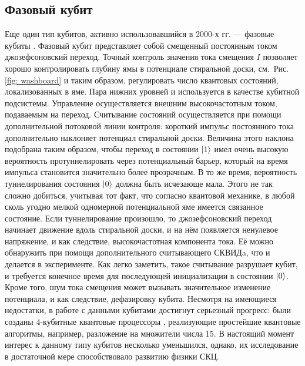 \subsection{Фазовый кубит}
Еще один тип кубитов, активно использовавшийся в 2000-х гг. --- фазовые кубиты \cite{martinis2009superconducting}. Фазовый кубит представляет собой смещенный постоянным током джозефсоновский переход. Точный контроль значения тока смещения $I$ позволяет хорошо контролировать глубину ямы в потенциале стиральной доски, см.~Рис. \ref{fig: washboard} и таким образом, регулировать число квантовых состояний, локализованных в яме. Пара нижних уровней и используется в качестве кубитной подсистемы. Управление осуществляется внешним высокочастотным током, подаваемым на переход. Считывание состояний \cite{steffen2006measurement} осуществляется при помощи дополнительной потоковой линии контроля: короткий импульс постоянного тока дополнительно наклоняет потенциал стиральной доски. Величина этого наклона подобрана таким образом, чтобы переход в состоянии $\ket{1}$ имел очень высокую вероятность протуннелировать через потенциальный барьер, который на время импульса становится значительно более прозрачным. В то же время, вероятность туннелирования состояния $\ket{0}$ должна быть исчезающе мала. Этого не так сложно добиться, учитывая тот факт, что согласно квантовой механике, в любой сколь угодно мелкой одномерной потенциальной яме имеется связанное состояние. Если туннелирование произошло, то джозефсоновский переход начинает движение вдоль стиральной доски, и на нём появляется ненулевое напряжение, и как следствие, высокочастотная компонента тока. Её можно обнаружить при помощи дополнительного считывающего СКВИДa, что и делается в эксперименте. Как легко заметить, такое считывание разрушает кубит, и требуется конечное время для последующей инициализации в состоянии $\ket{0}$. Кроме того, шум тока смещения может вызывать значительное изменение потенциала, и как следствие, дефазировку кубита. Несмотря на имеющиеся недостатки, в работе с данными кубитами достигнут серьезный прогресс: были созданы 4-кубитные квантовые процессоры \cite{lucero2012computing}, реализующие простейшие квантовые алгоритмы, например, разложение на множители числа 15. В настоящий момент интерес к данному типу кубитов несколько уменьшился, однако, их исследование в достаточной мере способствовало развитию физики СКЦ.
 
